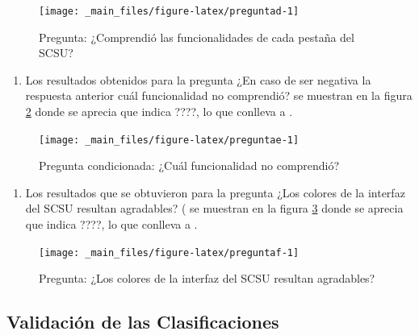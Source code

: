 \documentclass[
  12pt,
  openany]{book}
\providecommand{\tightlist}{%
  \setlength{\itemsep}{0pt}\setlength{\parskip}{0pt}}
\begin{document}
\begin{figure}

{\centering \texttt{[image: \_main\_files/figure-latex/preguntad-1]} 

}

\caption{Pregunta: ¿Comprendió las funcionalidades de cada pestaña del SCSU?}\label{fig:preguntad}
\end{figure}

\begin{enumerate}
\def\labelenumi{\arabic{enumi}.}
\setcounter{enumi}{4}
\tightlist
\item
  Los resultados obtenidos para la pregunta ¿En caso de ser negativa la respuesta anterior cuál funcionalidad no comprendió? se muestran en la figura \ref{fig:preguntae} donde se aprecia que indica ????, lo que conlleva a .
\end{enumerate}

\begin{figure}

{\centering \texttt{[image: \_main\_files/figure-latex/preguntae-1]} 

}

\caption{Pregunta condicionada: ¿Cuál funcionalidad no comprendió?}\label{fig:preguntae}
\end{figure}

\begin{enumerate}
\def\labelenumi{\arabic{enumi}.}
\setcounter{enumi}{5}
\tightlist
\item
  Los resultados que se obtuvieron para la pregunta ¿Los colores de la interfaz del SCSU resultan agradables? ( se muestran en la figura \ref{fig:preguntaf} donde se aprecia que indica ????, lo que conlleva a .
\end{enumerate}

\begin{figure}

{\centering \texttt{[image: \_main\_files/figure-latex/preguntaf-1]} 

}

\caption{Pregunta: ¿Los colores de la interfaz del SCSU resultan agradables? }\label{fig:preguntaf}
\end{figure}

\hypertarget{validaciuxf3n-de-las-clasificaciones}{%
\subsection{Validación de las Clasificaciones}\label{validaciuxf3n-de-las-clasificaciones}}
\end{document}
